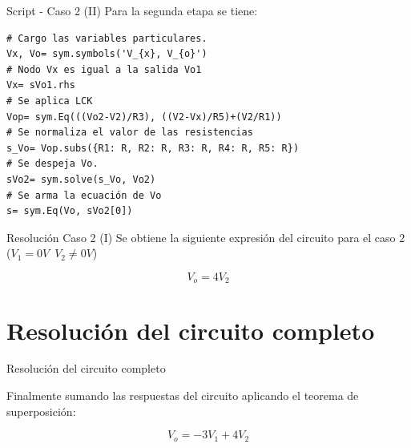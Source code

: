 \documentclass[14pt, aspectratio= 169]{beamer}
\begin{document}
% 
\begin{frame}[fragile]{Script  - Caso 2 (II)}
Para la segunda etapa se tiene:
\begin{lstlisting}[style=python]
# Cargo las variables particulares.
Vx, Vo= sym.symbols('V_{x}, V_{o}')
# Nodo Vx es igual a la salida Vo1
Vx= sVo1.rhs
# Se aplica LCK
Vop= sym.Eq(((Vo2-V2)/R3), ((V2-Vx)/R5)+(V2/R1))
# Se normaliza el valor de las resistencias
s_Vo= Vop.subs({R1: R, R2: R, R3: R, R4: R, R5: R})
# Se despeja Vo.
sVo2= sym.solve(s_Vo, Vo2)
# Se arma la ecuación de Vo
s= sym.Eq(Vo, sVo2[0])
\end{lstlisting}
\end{frame}


\begin{frame}{Resolución Caso 2 (I)}
Se obtiene la siguiente expresión del circuito para el caso 2 ($V_{1}= 0V \, \, \, V_{2}\neq 0V$)

$$ \boxed{ V_{o}= 4 V_{2}} $$
\end{frame}

% 
\section{Resolución del circuito completo}
\begin{frame}{Resolución del circuito completo}

Finalmente sumando las respuestas del circuito aplicando el teorema de superposición:

$$ \boxed{ V_{o}= -3 V_{1} + 4 V_{2} } $$

\end{frame}
\end{document}
